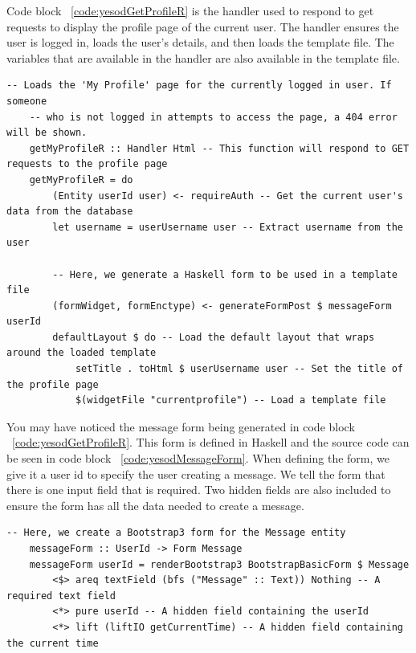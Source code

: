 Code block ~\ref{code:yesodGetProfileR} is the handler used to respond to get requests
to display the profile page of the current user. The handler ensures the user is logged in,
loads the user's details,
and then loads the template file. The variables that are available
in the handler are also available in the template file.


\begin{lstlisting}[caption={GET request handler for current profile page},label={code:yesodGetProfileR}]
	-- Loads the 'My Profile' page for the currently logged in user. If someone
	-- who is not logged in attempts to access the page, a 404 error will be shown.
	getMyProfileR :: Handler Html -- This function will respond to GET requests to the profile page
	getMyProfileR = do
		(Entity userId user) <- requireAuth -- Get the current user's data from the database
		let username = userUsername user -- Extract username from the user
	
		-- Here, we generate a Haskell form to be used in a template file
		(formWidget, formEnctype) <- generateFormPost $ messageForm userId
		defaultLayout $ do -- Load the default layout that wraps around the loaded template
			setTitle . toHtml $ userUsername user -- Set the title of the profile page
			$(widgetFile "currentprofile") -- Load a template file
\end{lstlisting}

You may have noticed the message form being generated in code block ~\ref{code:yesodGetProfileR}.
This form is defined in Haskell and the source code can be seen in code block ~\ref{code:yesodMessageForm}.
When defining the form, we give it a user id to specify the user creating a message. 
We tell the form that there is one input field that is required. Two hidden fields
are also included to ensure the form has all the data needed to create a message.

\clearpage 
\begin{lstlisting}[caption={The message form},label={code:yesodMessageForm}]
	-- Here, we create a Bootstrap3 form for the Message entity
	messageForm :: UserId -> Form Message
	messageForm userId = renderBootstrap3 BootstrapBasicForm $ Message
		<$> areq textField (bfs ("Message" :: Text)) Nothing -- A required text field
		<*> pure userId -- A hidden field containing the userId
		<*> lift (liftIO getCurrentTime) -- A hidden field containing the current time
\end{lstlisting}

